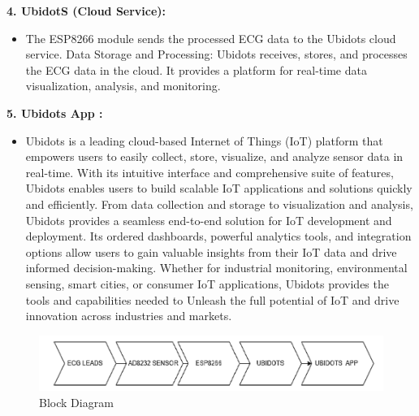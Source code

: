 \textbf{4. UbidotS (Cloud Service):}
\begin{itemize}
   \item The ESP8266 module sends the processed ECG data to the Ubidots cloud service.
   Data Storage and Processing: Ubidots receives, stores, and processes the ECG data in the cloud.
  It provides a platform for real-time data visualization, analysis, and monitoring.
\end{itemize}
\textbf{5. Ubidots App :}
\begin{itemize}
   \item Ubidots is a leading cloud-based Internet of Things (IoT) platform that empowers users to easily collect, store, visualize, and analyze sensor data in real-time. With its intuitive interface and comprehensive suite of features, Ubidots enables users to build scalable IoT applications and solutions quickly and efficiently. From data collection and storage to visualization and analysis, Ubidots provides a seamless end-to-end solution for IoT development and deployment. Its ordered dashboards, powerful analytics tools, and integration options allow users to gain valuable insights from their IoT data and drive informed decision-making. Whether for industrial monitoring, environmental sensing, smart cities, or consumer IoT applications, Ubidots provides the tools and capabilities needed to Unleash the full potential of IoT and drive innovation across industries and markets.
\end{itemize}


 \begin{figure}[htbp]
    \centering
     \includegraphics[width=1.1\linewidth]{C_chap/fig6.png}
\caption{ Block Diagram}
 \end{figure}

